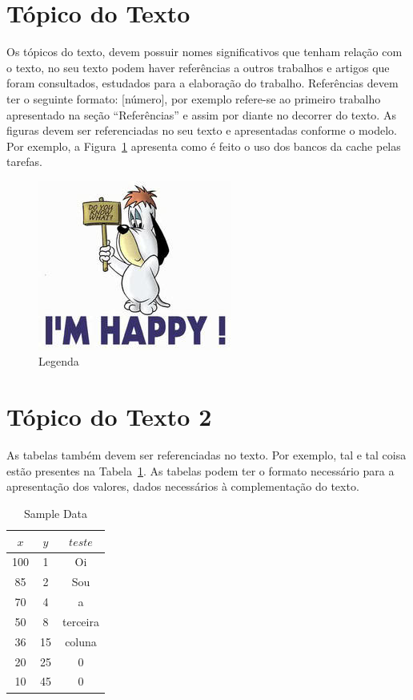 \documentclass[times, 10pt,twocolumn]{article}
\begin{document}
\section{Tópico do Texto} \label{sec_topico_texto}
Os tópicos do texto, devem possuir nomes significativos que tenham relação com o texto, no seu texto podem haver referências a outros trabalhos e artigos que foram consultados, estudados para a elaboração do trabalho. Referências devem ter o seguinte formato: [número], por exemplo \cite{Codishetal2000} refere-se ao primeiro trabalho apresentado na seção “Referências” e assim por diante no decorrer do texto.
As figuras devem ser referenciadas no seu texto e apresentadas conforme o modelo. Por exemplo, a Figura~{\ref{fig:figura-001}} apresenta como é feito o uso dos bancos da cache pelas tarefas.

\begin{figure}[!htb]
    \centering
    \includegraphics{figuras/droopy.jpg}
    \caption{Legenda}
    \label{fig:figura-001}
\end{figure}

\section{Tópico do Texto 2} \label{sec_topico_texto_2}

As tabelas também devem ser referenciadas no texto. Por exemplo, tal e tal coisa estão presentes na Tabela~{\ref{tab:tabela-001}}. As tabelas podem ter o formato necessário para a apresentação dos valores, dados necessários à complementação do texto.


\begin{table}[h]
\caption {Sample Data}
\begin{center}
\begin{tabular}{|c|c|c|} \hline
$x$ & $y$ & $teste$  \\
\hline \hline
100 & 1 & Oi \\
\hline
85 & 2 & Sou  \\
\hline
70 & 4 & a  \\
\hline
50 & 8 & terceira  \\
\hline
36 & 15 & coluna  \\
\hline
20 & 25 & 0  \\
\hline
10 & 45 & 0  \\
\hline
\end{tabular}
\end{center}
\label{tab:tabela-001}
\end{table}
\end{document}
